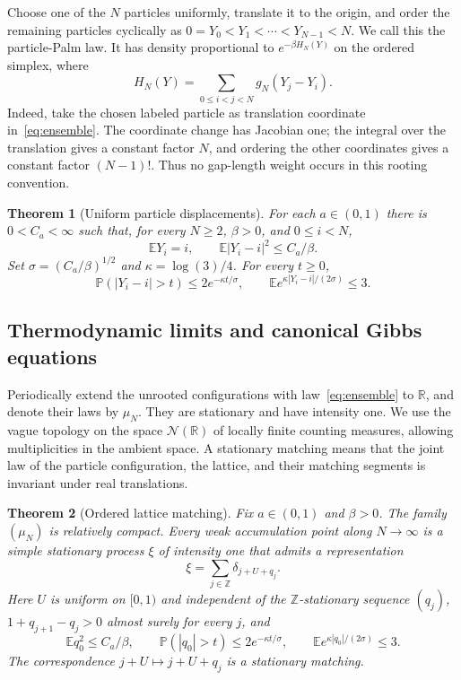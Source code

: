 \documentclass[11pt]{article}
\newtheorem{theorem}{Theorem}[section]
\theoremstyle{remark}\newtheorem{remark}[theorem]{Remark}
\newcommand{\E}{\mathbb E}
\newcommand{\Prob}{\mathbb P}
\newcommand{\R}{\mathbb R}
\newcommand{\Z}{\mathbb Z}
\newcommand{\Conf}{\mathcal N}
\begin{document}
Choose one of the $N$ particles uniformly, translate it to the origin,
and order the remaining particles cyclically as
$0=Y_0<Y_1<\cdots<Y_{N-1}<N$.
We call this the particle-Palm law. It has density proportional to
$e^{-\beta H_N(Y)}$ on the ordered simplex, where
\begin{equation}\label{eq:palm-energy}
 H_N(Y)=\sum_{0\le i<j<N}g_N(Y_j-Y_i).
\end{equation}
Indeed, take the chosen labeled particle as translation coordinate
in~\eqref{eq:ensemble}. The coordinate change has Jacobian one;
the integral over the translation gives a constant factor $N$, and
ordering the other coordinates gives a constant factor $(N-1)!$.
Thus no gap-length weight occurs in this rooting convention.

\begin{theorem}[Uniform particle displacements]\label{thm:finite}
For each $a\in(0,1)$ there is $0<C_a<\infty$ such that, for every
$N\ge2$, $\beta>0$, and $0\le i<N$,
\begin{equation}\label{eq:finite}
 \E Y_i=i,\qquad \E|Y_i-i|^2\le C_a/\beta.
\end{equation}
Set $\sigma=(C_a/\beta)^{1/2}$ and $\kappa=\log(3)/4$.
For every $t\ge0$,
\begin{equation}\label{eq:exp}
 \Prob(|Y_i-i|>t)\le2e^{-\kappa t/\sigma},\qquad
 \E e^{\kappa|Y_i-i|/(2\sigma)}\le3.
\end{equation}
\end{theorem}

\subsection{Thermodynamic limits and canonical Gibbs equations}

Periodically extend the unrooted configurations with
law~\eqref{eq:ensemble} to $\R$, and denote their laws by $\mu_N$.
They are stationary and have intensity one. We use the vague
topology on the space $\Conf(\R)$ of locally finite counting measures,
allowing multiplicities in the ambient space. A stationary matching
means that the joint law of the particle configuration, the lattice,
and their matching segments is invariant under real translations.

\begin{theorem}[Ordered lattice matching]\label{thm:limit}
Fix $a\in(0,1)$ and $\beta>0$. The family $(\mu_N)$ is relatively
compact. Every weak accumulation point along $N\to\infty$ is a
simple stationary process $\xi$ of intensity one that admits a
representation
\begin{equation}\label{eq:matching}
 \xi=\sum_{j\in\Z}\delta_{j+U+q_j}.
\end{equation}
Here $U$ is uniform on $[0,1)$ and independent of the
$\Z$-stationary sequence $(q_j)$,
$1+q_{j+1}-q_j>0$ almost surely for every $j$, and
\begin{equation}\label{eq:limit-moments}
 \E q_0^2\le C_a/\beta,\qquad
 \Prob(|q_0|>t)\le2e^{-\kappa t/\sigma},\qquad
 \E e^{\kappa|q_0|/(2\sigma)}\le3.
\end{equation}
The correspondence $j+U\mapsto j+U+q_j$ is a stationary matching.
\end{theorem}
\end{document}
